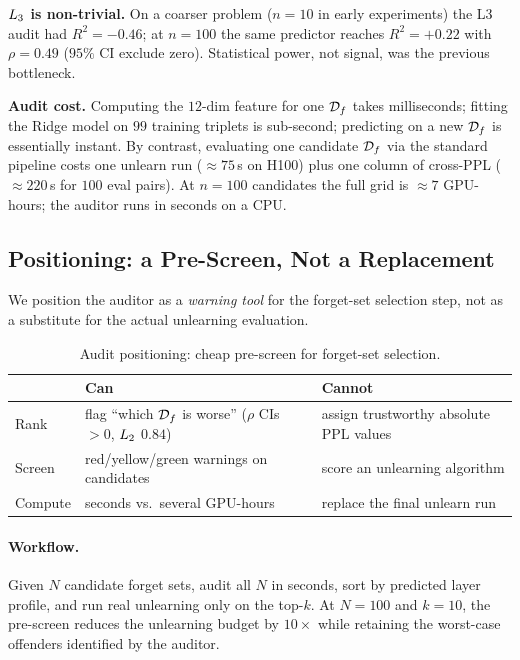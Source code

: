 \textbf{$L_3$ is non-trivial.} On a coarser problem ($n{=}10$ in early experiments) the L3 audit had $R^2{=}-0.46$; at $n{=}100$ the same predictor reaches $R^2{=}+0.22$ with $\rho{=}0.49$ ($95\%$ CI exclude zero). Statistical power, not signal, was the previous bottleneck.

\textbf{Audit cost.} Computing the $12$-dim feature for one $\mathcal{D}_f$ takes milliseconds; fitting the Ridge model on $99$ training triplets is sub-second; predicting on a new $\mathcal{D}_f$ is essentially instant. By contrast, evaluating one candidate $\mathcal{D}_f$ via the standard pipeline costs one unlearn run ($\approx 75$\,s on H100) plus one column of cross-PPL ($\approx 220$\,s for $100$ eval pairs). At $n{=}100$ candidates the full grid is $\approx 7$ GPU-hours; the auditor runs in seconds on a CPU.

\subsection{Positioning: a Pre-Screen, Not a Replacement}
\label{sec:positioning}

We position the auditor as a \emph{warning tool} for the forget-set selection step, not as a substitute for the actual unlearning evaluation.

\begin{table}[t]
\centering
\small
\setlength{\tabcolsep}{3pt}
\renewcommand{\arraystretch}{1.05}
\begin{tabular}{@{}p{} p{} p{}@{}}
    \toprule
              & \textbf{Can}                                  & \textbf{Cannot} \\
    \midrule
    Rank      & flag ``which $\mathcal{D}_f$ is worse'' ($\rho$ CIs $\!>\!0$, $L_2$ $0.84$) & assign trustworthy absolute PPL values \\
    Screen    & red/yellow/green warnings on candidates       & score an unlearning algorithm \\
    Compute   & seconds vs.\ several GPU-hours                & replace the final unlearn run \\
    \bottomrule
\end{tabular}
\caption{Audit positioning: cheap pre-screen for forget-set selection.}
\label{tab:positioning}
\end{table}

\paragraph{Workflow.} Given $N$ candidate forget sets, audit all $N$ in seconds, sort by predicted layer profile, and run real unlearning only on the top-$k$. At $N{=}100$ and $k{=}10$, the pre-screen reduces the unlearning budget by $10\times$ while retaining the worst-case offenders identified by the auditor.
